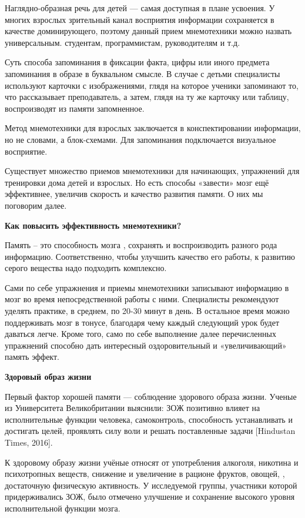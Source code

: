 Наглядно-образная речь для детей --- самая доступная в плане усвоения. У многих взрослых зрительный канал восприятия информации сохраняется в качестве доминирующего, поэтому данный прием мнемотехники можно назвать универсальным.  студентам, программистам, руководителям и т.д.

Суть способа запоминания в фиксации факта, цифры или иного предмета запоминания в образе в буквальном смысле. В случае с детьми специалисты используют карточки с изображениями, глядя на которое ученики запоминают то, что рассказывает преподаватель, а затем, глядя на ту же карточку или таблицу, воспроизводят из памяти запомненное.

Метод мнемотехники для взрослых заключается в конспектировании информации, но не словами, а блок-схемами. Для запоминания подключается визуальное восприятие.

Существует множество приемов мнемотехники для начинающих, упражнений для тренировки дома детей и взрослых. Но есть способы «завести» мозг ещё эффективнее, увеличив скорость и качество развития памяти. О них мы поговорим далее.

\textbf{Как повысить эффективность мнемотехники?}

Память -- это способность мозга , сохранять и воспроизводить разного рода информацию. Соответственно, чтобы улучшить качество его работы, к развитию серого вещества надо подходить комплексно.

Сами по себе упражнения и приемы мнемотехники записывают информацию в мозг во время непосредственной работы с ними. Специалисты рекомендуют уделять практике, в среднем, по 20-30 минут в день. В остальное время можно поддерживать мозг в тонусе, благодаря чему каждый следующий урок будет даваться легче. Кроме того, само по себе выполнение далее перечисленных упражнений способно дать интересный оздоровительный и «увеличивающий» память эффект.

\textbf{Здоровый образ жизни}

Первый фактор хорошей памяти --- соблюдение здорового образа жизни. Ученые из Университета Великобритании выяснили: ЗОЖ позитивно влияет на исполнительные функции человека, самоконтроль, способность устанавливать и достигать целей, проявлять силу воли и решать поставленные задачи [Hindustan Times, 2016].

К здоровому образу жизни учёные относят  от употребления алкоголя, никотина и психотропных веществ, снижение   и увеличение в рационе фруктов, овощей, , достаточную физическую активность. У исследуемой группы, участники которой придерживались ЗОЖ, было отмечено улучшение и сохранение высокого уровня исполнительной функции мозга.


